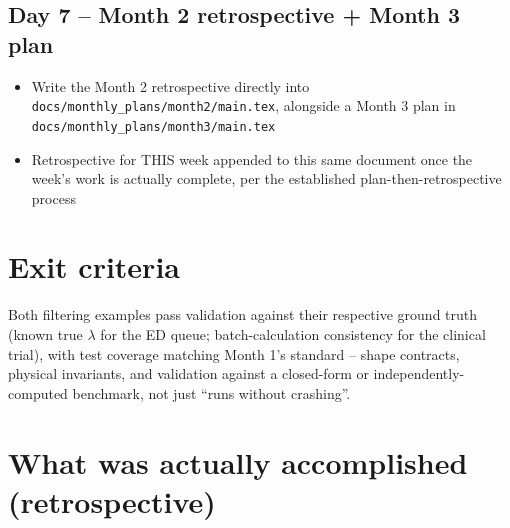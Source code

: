 \documentclass[11pt]{article}
\begin{document}
\subsection*{Day 7 -- Month 2 retrospective + Month 3 plan}
\begin{itemize}[leftmargin=*]
  \item Write the Month 2 retrospective directly into
    \texttt{docs/monthly\_plans/month2/main.tex}, alongside a Month 3
    plan in \texttt{docs/monthly\_plans/month3/main.tex}
  \item Retrospective for THIS week appended to this same document
    once the week's work is actually complete, per the established
    plan-then-retrospective process
\end{itemize}

\section*{Exit criteria}
Both filtering examples pass validation against their respective
ground truth (known true $\lambda$ for the ED queue; batch-calculation
consistency for the clinical trial), with test coverage matching
Month 1's standard -- shape contracts, physical invariants, and
validation against a closed-form or independently-computed benchmark,
not just ``runs without crashing''.


\section*{What was actually accomplished (retrospective)}
\end{document}
